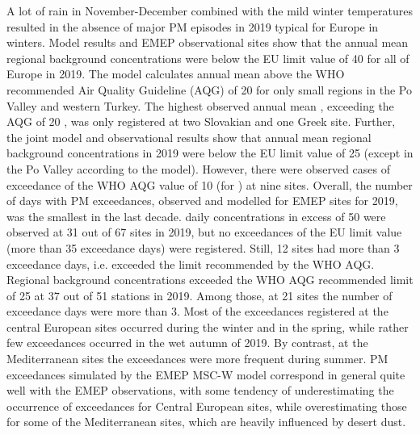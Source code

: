 A lot of rain in November-December combined with the mild winter temperatures resulted in the absence of major PM episodes in 2019 typical for Europe in winters. Model results and EMEP observational sites show that the annual mean regional background \PM[10] concentrations were below the EU limit value of 40 \ug for all of Europe in 2019. The model calculates annual mean \PM[10] above the WHO recommended Air Quality Guideline (AQG) of 20 \ug for only small regions in the Po Valley and western Turkey. The highest observed annual mean \PM[10], exceeding the AQG of 20 \ug, was only registered at two Slovakian and one Greek site. Further, the joint model and observational results show that annual mean regional background \PM[2.5] concentrations in 2019 were below the EU limit value of 25 \ug (except in the Po Valley according to the model). However, there were observed cases of exceedance of the WHO AQG value of 10 \ug (for \PM[2.5]) at nine sites.
Overall, the number of days with PM exceedances, observed and modelled for EMEP sites for 2019, was the smallest in the last decade. \PM[10] daily concentrations in excess of 50 \ug were observed at 31 out of 67 sites in 2019, but no exceedances of the \PM[10] EU limit value (more than 35 exceedance days) were registered. Still, 12 sites had more than 3 exceedance days, i.e. exceeded the limit recommended by the WHO AQG. %
Regional background \PM[2.5] concentrations exceeded the WHO AQG recommended limit of 25 \ug at 37 out of 51 stations in 2019. Among those, at 21 sites the number of exceedance days were more than 3.
Most of the exceedances registered at the central European sites occurred during the winter and in the spring, while rather few exceedances occurred in the wet autumn of 2019. By contrast, at the Mediterranean sites the exceedances were more frequent during summer. PM exceedances simulated by the EMEP MSC-W model correspond in general quite well with the EMEP observations, with some tendency of underestimating the occurrence of exceedances for Central European sites, while overestimating those for some of the Mediterranean sites, which are heavily influenced by desert dust.



